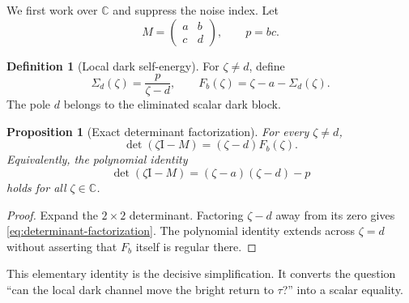 \documentclass[11pt]{article}
\newtheorem{proposition}[theorem]{Proposition}
\theoremstyle{definition}
\newtheorem{definition}[theorem]{Definition}
\theoremstyle{remark}
\newcommand{\C}{\mathbb C}
\newcommand{\Id}{\mathrm I}
\begin{document}
We first work over $\C$ and suppress the noise index.  Let
\begin{equation}\label{eq:generic-matrix}
 M=\begin{pmatrix}a&b\\c&d\end{pmatrix},
 \qquad p=bc.
\end{equation}

\begin{definition}[Local dark self-energy]
For $\zeta\ne d$, define
\begin{equation}\label{eq:self-energy}
 \Sigma_d(\zeta)=\frac{p}{\zeta-d},
 \qquad
 F_b(\zeta)=\zeta-a-\Sigma_d(\zeta).
\end{equation}
The pole $d$ belongs to the eliminated scalar dark block.
\end{definition}

\begin{proposition}[Exact determinant factorization]
\label{prop:determinant-factorization}
For every $\zeta\ne d$,
\begin{equation}\label{eq:determinant-factorization}
 \det(\zeta\Id-M)=(\zeta-d)F_b(\zeta).
\end{equation}
Equivalently, the polynomial identity
\begin{equation}\label{eq:characteristic-polynomial}
 \det(\zeta\Id-M)=(\zeta-a)(\zeta-d)-p
\end{equation}
holds for all $\zeta\in\C$.
\end{proposition}

\begin{proof}
Expand the $2\times2$ determinant.  Factoring $\zeta-d$ away from its zero
gives \eqref{eq:determinant-factorization}.  The polynomial identity extends
across $\zeta=d$ without asserting that $F_b$ itself is regular there.
\end{proof}

This elementary identity is the decisive simplification.  It converts the
question ``can the local dark channel move the bright return to $\tau$?''
into a scalar equality.
\end{document}
